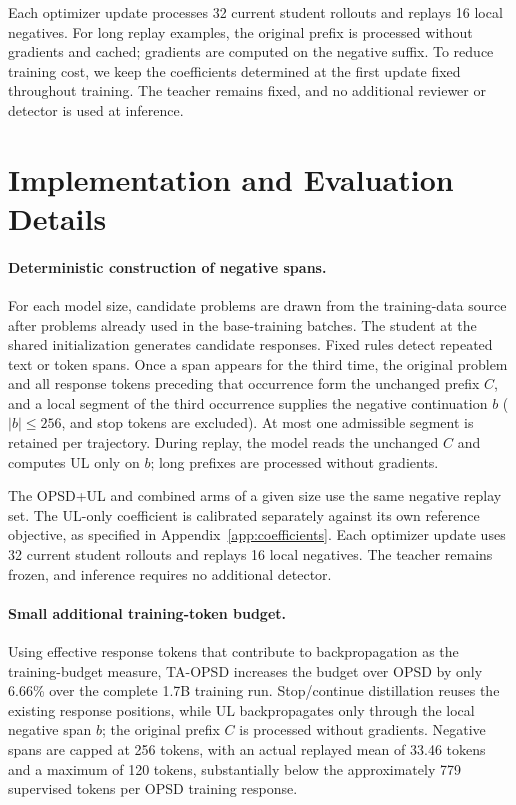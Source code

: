 \documentclass{article} %
\begin{document}
Each optimizer update processes 32 current student rollouts and replays 16 local negatives. For long replay examples, the original prefix is processed without gradients and cached; gradients are computed on the negative suffix. To reduce training cost, we keep the coefficients determined at the first update fixed throughout training. The teacher remains fixed, and no additional reviewer or detector is used at inference.

\section{Implementation and Evaluation Details}
\label{app:implementation}

\paragraph{Deterministic construction of negative spans.} For each model size, candidate problems are drawn from the training-data source after problems already used in the base-training batches. The student at the shared initialization generates candidate responses. Fixed rules detect repeated text or token spans. Once a span appears for the third time, the original problem and all response tokens preceding that occurrence form the unchanged prefix $C$, and a local segment of the third occurrence supplies the negative continuation $b$ ($|b|\leq256$, and stop tokens are excluded). At most one admissible segment is retained per trajectory. During replay, the model reads the unchanged $C$ and computes UL only on $b$; long prefixes are processed without gradients.

The OPSD+UL and combined arms of a given size use the same negative replay set. The UL-only coefficient is calibrated separately against its own reference objective, as specified in Appendix~\ref{app:coefficients}. Each optimizer update uses 32 current student rollouts and replays 16 local negatives. The teacher remains frozen, and inference requires no additional detector.

\paragraph{Small additional training-token budget.} Using effective response tokens that contribute to backpropagation as the training-budget measure, TA-OPSD increases the budget over OPSD by only 6.66\% over the complete 1.7B training run. Stop/continue distillation reuses the existing response positions, while UL backpropagates only through the local negative span $b$; the original prefix $C$ is processed without gradients. Negative spans are capped at 256 tokens, with an actual replayed mean of 33.46 tokens and a maximum of 120 tokens, substantially below the approximately 779 supervised tokens per OPSD training response.
\end{document}
